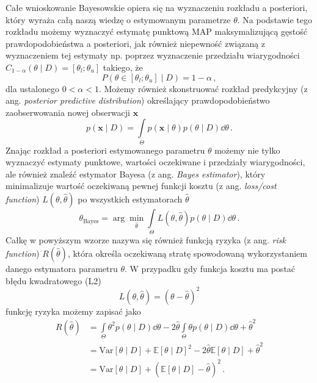 \documentclass{myclass}
\begin{document}
Całe wnioskowanie Bayesowskie opiera się na wyznaczeniu rozkładu a posteriori, który wyraża całą
naszą wiedzę o estymowanym parametrze \(\theta\). Na podstawie tego rozkładu możemy wyznaczyć
estymatę punktową MAP maksymalizującą gęstość prawdopodobieństwa a posteriori, jak również
niepewność związaną z wyznaczeniem tej estymaty np. poprzez wyznaczenie przedziału wiarygodności
\(C_{1-\alpha}(\theta \mid D) = [\theta_l ; \theta_u]\) takiego, że
\begin{equation*}
    P(\theta \in [\theta_l ; \theta_u] \mid D) = 1 - \alpha\,,
\end{equation*}
dla ustalonego \(0 < \alpha < 1\). Możemy również skonstruować rozkład predykcyjny (z ang.
\textit{posterior predictive distribution}) określający prawdopodobieństwo zaobserwowania nowej
obserwacji \(\mathbf{x}\)
\begin{equation*}
    p(\mathbf{x} \mid D) = \int\limits_\Theta p(\mathbf{x} \mid \theta) p(\theta \mid D) \dd{\theta}\,.
\end{equation*}
Znając rozkład a posteriori estymowanego parametru \(\theta\) możemy nie tylko wyznaczyć estymaty
punktowe, wartości oczekiwane i przedziały wiarygodności, ale również znaleźć estymator Bayesa (z
ang. \textit{Bayes estimator}), który minimalizuje wartość oczekiwaną pewnej funkcji kosztu (z ang.
\textit{loss/cost function}) \(L(\theta, \hat{\theta})\) po wszystkich estymatorach \(\hat{\theta}\)
\begin{equation*}
    \theta_\text{Bayes} = \arg\min_{\hat{\theta}} \int\limits_{\Theta} L(\theta, \hat{\theta}) p(\theta \mid D) \dd{\theta}\,.
\end{equation*}
Całkę w powyższym wzorze nazywa się również funkcją ryzyka (z ang. \textit{risk function})
\(R(\hat{\theta})\), która określa oczekiwaną stratę spowodowaną wykorzystaniem danego estymatora
parametru \(\theta\). W przypadku gdy funkcja kosztu ma postać błędu kwadratowego (L2)
\begin{equation*}
    L(\theta,\hat{\theta}) = (\theta - \hat{\theta})^2
\end{equation*}
funkcję ryzyka możemy zapisać jako
\begin{equation*}
    \begin{split}
        R(\hat{\theta}) &= \int\limits_\Theta \theta^2 p(\theta \mid D) \dd{\theta} - 2 \hat{\theta}\int\limits_\Theta \theta p(\theta \mid D) \dd{\theta} + \hat{\theta}^2 \\
        &= \text{Var}[\theta \mid D] + \mathbb{E}[\theta \mid D]^2 - 2 \hat{\theta}\mathbb{E}[\theta \mid D] + \hat{\theta}^2\\
        &= \text{Var}[\theta \mid D] + \left(\mathbb{E}[\theta \mid D] - \hat{\theta}\right)^2\,.
    \end{split}
\end{equation*}
\end{document}
